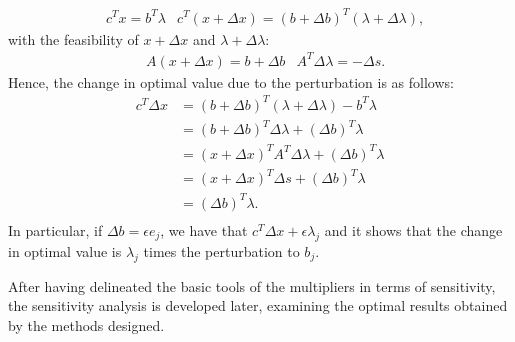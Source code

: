 \documentclass[a4paper,10 pt,titlepage,twoside]{book}
\theoremstyle{plain}
\theoremstyle{definition}
\theoremstyle{remark}
\begin{document}
\begin{align*}
&c^{T}x=b^{T}\lambda  &c^{T}(x + \Delta x)=\left(b+\Delta b\right)^{T}\left(\lambda+\Delta \lambda\right),
\end{align*}
with the feasibility of $x + \Delta x$ and $\lambda+\Delta \lambda$:
\begin{align*}
&A(x + \Delta x)=b+\Delta b
&A^{T}\Delta\lambda=-\Delta s.
\end{align*}
Hence, the change in optimal value due to the perturbation is as follows:
\begin{align*}
c^{T}\Delta x&=\left(b+\Delta b\right)^{T}\left(\lambda+\Delta \lambda\right) - b^{T}\lambda\\
&=\left(b+\Delta b\right)^{T}\Delta \lambda+\left(\Delta b\right)^{T}\lambda\\
&=\left(x+\Delta x\right)^{T}A^{T}\Delta \lambda+\left(\Delta b\right)^{T}\lambda\\
&=\left(x+\Delta x\right)^{T}\Delta s+\left(\Delta b\right)^{T}\lambda\\
&=\left(\Delta b\right)^{T}\lambda.\\
\end{align*} 
In particular, if $\Delta b = \epsilon e_{j}$, we have that $c^{T}\Delta x+\epsilon \lambda_{j}$ and it shows that the change in optimal value is $\lambda_{j}$ times the perturbation to $b_{j}$.

After having delineated the basic tools of the multipliers in terms of sensitivity, the sensitivity analysis is developed later, examining the optimal results obtained by the methods designed.\\

%
%
\end{document}
